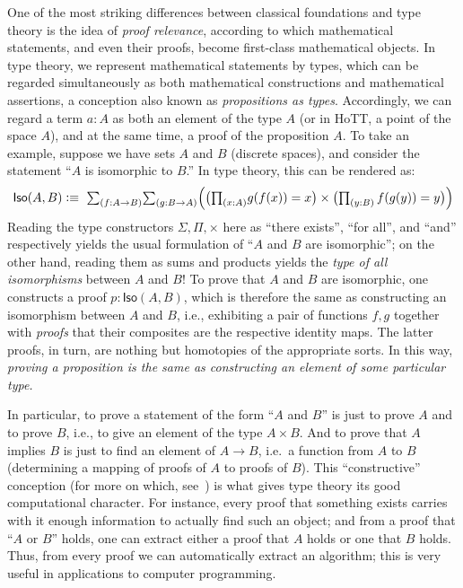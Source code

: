 One of the most striking differences between classical foundations and type theory is the idea of \emph{proof relevance}, according to which mathematical statements, and even their proofs, become first-class mathematical objects.
In type theory, we represent mathematical statements by types, which can be regarded simultaneously as both mathematical constructions and mathematical assertions, a conception also known as \emph{propositions as types}.
Accordingly, we can regard a term $a : A$ as both an element of the type $A$ (or in HoTT, a point of the space $A$), and at the same time, a proof of the proposition $A$.
To take an example, suppose we have sets $A$ and $B$ (discrete spaces), and consider the statement ``$A$ is isomorphic to $B$.''
In type theory, this can be rendered as:
\[
\mathsf{Iso}(A,B) \defeq\ \tsm{f : A\to B}{g : B\to A}\Bigl(\bigl(\tprd{x:A} g(f(x)) = x\bigr) \times \bigl(\tprd{y:B}\, f(g(y)) = y\bigr)\Bigr)
\]
%
Reading the type constructors $\Sigma, \Pi, \times$  here  as ``there exists'', ``for all'', and ``and'' respectively yields the usual formulation of ``$A$ and $B$ are isomorphic''; on the other hand, reading them as sums and products yields the \emph{type of all isomorphisms} between $A$ and $B$!  To prove that $A$ and $B$ are isomorphic, one  constructs a proof $p : \mathsf{Iso}(A,B)$, which is therefore the same  as constructing an isomorphism between $A$ and $B$, i.e., exhibiting a pair of functions $f, g$ together with \emph{proofs} that their composites are the respective identity maps.  The latter proofs, in turn, are nothing but homotopies of the appropriate sorts.  In this way, \emph{proving a proposition is the same as constructing an element of some particular type.}

In particular, to prove a statement of the form ``$A$ and $B$'' is just to prove $A$ and to prove $B$, i.e., to give an element of the type $A\times B$.
And to prove that $A$ implies $B$ is just to find an element of $A\to B$, i.e.\ a function from $A$ to $B$ (determining a mapping of proofs of $A$ to proofs of $B$).
This ``constructive'' conception (for more on which, see~\cite{kolmogorov,BHK}) is what gives type theory its good computational character.
For instance, every proof that something exists carries with it enough information to actually find such an object; and from a proof that  ``$A$ or $B$'' holds, one can extract either a proof that $A$ holds or one that $B$ holds.
Thus, from every proof we can automatically extract an algorithm; this is very useful in applications to computer programming.

